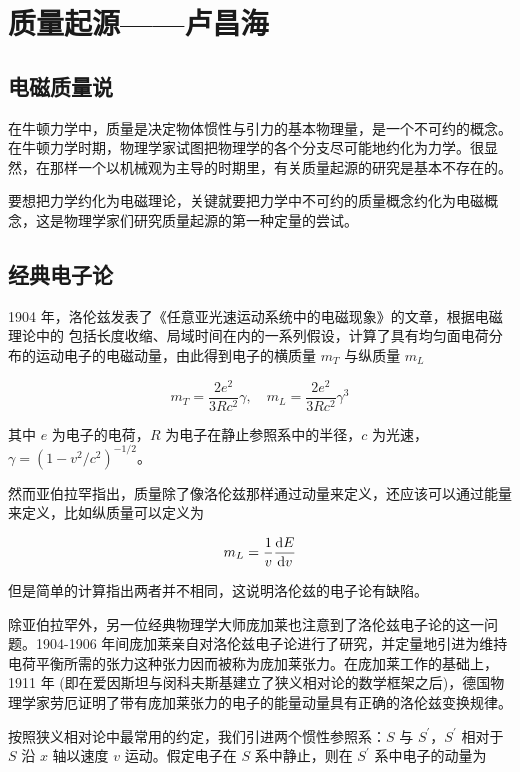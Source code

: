 \chapter{质量起源——卢昌海}

\section{电磁质量说}

在牛顿力学中，质量是决定物体惯性与引力的基本物理量，是一个不可约的概念。在牛顿力学时期，物理学家试图把物理学的各个分支尽可能地约化为力学。很显然，在那样一个以机械观为主导的时期里，有关质量起源的研究是基本不存在的。

要想把力学约化为电磁理论，关键就要把力学中不可约的质量概念约化为电磁概念，这是物理学家们研究质量起源的第一种定量的尝试。

\section{经典电子论}

1904 年，洛伦兹发表了《任意亚光速运动系统中的电磁现象》的文章，根据电磁理论中的
包括长度收缩、局域时间在内的一系列假设，计算了具有均匀面电荷分布的运动电子的电磁动量，由此得到电子的横质量 $m_T$ 与纵质量 $m_L$

\begin{equation}
    m_T = \frac{2 e^2}{3 R c^2} \gamma, \quad m_L = \frac{2 e^2}{3 R c^2} \gamma^3
\end{equation}

\noindent 其中 $e$ 为电子的电荷，$R$ 为电子在静止参照系中的半径，$c$ 为光速，$\gamma=(1-v^2/c^2)^{-1/2}$。

\noindent 然而亚伯拉罕指出，质量除了像洛伦兹那样通过动量来定义，还应该可以通过能量来定义，比如纵质量可以定义为

\begin{equation}
    m_L = \frac{1}{v} \frac{\mathop{}\!\mathrm{d} E}{\mathop{}\!\mathrm{d} v}
\end{equation}

但是简单的计算指出两者并不相同，这说明洛伦兹的电子论有缺陷。

除亚伯拉罕外，另一位经典物理学大师庞加莱也注意到了洛伦兹电子论的这一问题。1904-1906 年间庞加莱亲自对洛伦兹电子论进行了研究，并定量地引进为维持电荷平衡所需的张力这种张力因而被称为庞加莱张力。在庞加莱工作的基础上，1911 年 (即在爱因斯坦与闵科夫斯基建立了狭义相对论的数学框架之后)，德国物理学家劳厄证明了带有庞加莱张力的电子的能量动量具有正确的洛伦兹变换规律。

按照狭义相对论中最常用的约定，我们引进两个惯性参照系：$S$ 与 $S^\prime$，$S^\prime$ 相对于 $S$ 沿 $x$ 轴以速度 $v$ 运动。假定电子在 $S$ 系中静止，则在 $S^\prime$ 系中电子的动量为

